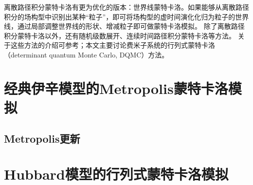 \documentclass[hyperref, UTF8]{ctexart}
\begin{document}
离散路径积分蒙特卡洛有更为优化的版本：世界线蒙特卡洛。如果能够从离散路径积分的场构型中识别出某种“粒子”，即可将场构型的虚时间演化化归为粒子的世界线，通过局部调整世界线的形状、增减粒子即可做蒙特卡洛模拟。
除了离散路径积分蒙特卡洛以外，还有随机级数展开、连续时间路径积分蒙特卡洛等方法。
关于这些方法的介绍可参考\cite{assaad2008world}；本文主要讨论费米子系统的行列式蒙特卡洛（determinant quantum Monte Carlo, DQMC）方法。

\section{经典伊辛模型的Metropolis蒙特卡洛模拟}

\subsection{Metropolis更新}



\section{Hubbard模型的行列式蒙特卡洛模拟}



\end{document}
